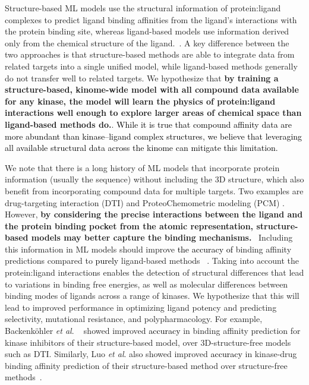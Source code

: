 \documentclass[9pt,lessons, pubversion]{livecoms}
\newcommand{\revision}[1]{\textcolor{black}{#1}}
\begin{document}
Structure-based ML models use the structural information of protein:ligand complexes to predict ligand binding affinities from the ligand's interactions with the protein binding site, whereas ligand-based models use information derived only from the chemical structure of the ligand.~\cite{sliwoski2014computational, sadybekov2023computational, backenkohler2023guided}. A key difference between the two approaches is that structure-based methods are able to integrate data from related targets into a single unified model, while ligand-based methods generally do not transfer well to related targets. We hypothesize that \textbf{by training a structure-based, kinome-wide model with all compound data available for any kinase, the model will learn the physics of protein:ligand interactions well enough to explore larger areas of chemical space than ligand-based methods do.}\cite{sliwoski2014computational, sadybekov2023computational}. 
\revision{While it is true that compound affinity data are more abundant than kinase–ligand complex structures, we believe that leveraging all available structural data across the kinome can mitigate this limitation.}

We note that there is a long history of ML models that incorporate protein information (usually the sequence) without including the 3D structure, which also benefit from incorporating compound data for multiple targets. Two examples are drug-targeting interaction (DTI) and ProteoChemometric modeling (PCM) \cite{kimber2021deep, Backenkhler2023}.
However, \textbf{by considering the precise interactions between the ligand and the protein binding pocket from the atomic representation, structure-based models may better capture the binding mechanisms.}~\cite{sliwoski2014computational} Including this information in ML models should improve \revision{the accuracy of} binding affinity predictions compared to \revision{purely} ligand-based methods
~\cite{liu2023hybrid, schaller2023benchmarking}. Taking into account the protein:ligand interactions enables the detection of structural differences that lead to variations in binding free energies, as well as molecular differences between binding modes of ligands across a range of kinases. We hypothesize that this will lead to improved performance in optimizing ligand potency and predicting selectivity, mutational resistance, and polypharmacology. For example, Backenk\"ohler \textit{et al}. ~\cite{backenkohler2023guided} showed improved \revision{accuracy} in binding affinity prediction for kinase inhibitors of their structure-based model, over 3D-structure-free models such as DTI. Similarly, Luo \textit{et al}. also showed improved \revision{accuracy} in kinase-drug binding affinity prediction of their structure-based method over structure-free methods~\cite{luo2023calibrated}.
\end{document}
